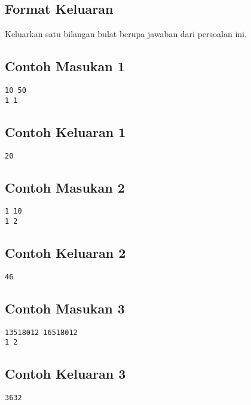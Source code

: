 \documentclass{article}
\begin{document}
\subsection*{Format Keluaran}

Keluarkan satu bilangan bulat berupa jawaban dari persoalan ini.

\begin{multicols}{2}
\subsection*{Contoh Masukan 1}
\begin{lstlisting}
10 50
1 1
\end{lstlisting}
\columnbreak
\subsection*{Contoh Keluaran 1}
\begin{lstlisting}
20
\end{lstlisting}
\vfill
\null
\end{multicols}

\begin{multicols}{2}
\subsection*{Contoh Masukan 2}
\begin{lstlisting}
1 10
1 2
\end{lstlisting}
\columnbreak
\subsection*{Contoh Keluaran 2}
\begin{lstlisting}
46
\end{lstlisting}
\vfill
\null
\end{multicols}

\begin{multicols}{2}
\subsection*{Contoh Masukan 3}
\begin{lstlisting}
13518012 16518012
1 2
\end{lstlisting}
\columnbreak
\subsection*{Contoh Keluaran 3}
\begin{lstlisting}
3632
\end{lstlisting}
\vfill
\null
\end{multicols}

\pagebreak
\end{document}
